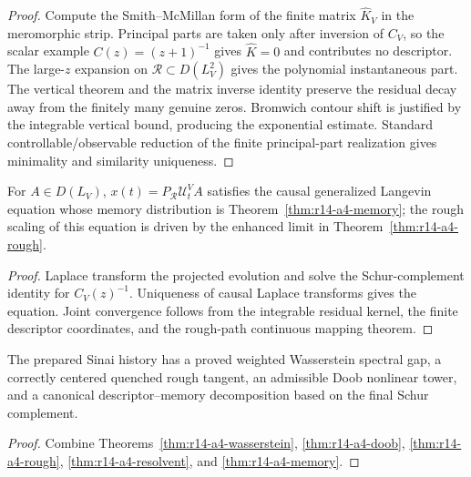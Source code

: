 \begin{proof}
Compute the Smith--McMillan form of the finite matrix
\(\widehat K_V\) in the meromorphic strip.  Principal parts are taken only
after inversion of \(C_V\), so the scalar example
\(C(z)=(z+1)^{-1}\) gives \(\widehat K=0\) and contributes no descriptor.
The large-\(z\) expansion on \(\mathcal R\subset D(L_V^2)\) gives the
polynomial instantaneous part.  The vertical theorem and the matrix inverse
identity preserve the residual decay away from the finitely many genuine
zeros.  Bromwich contour shift is justified by the integrable vertical
bound, producing the exponential estimate.  Standard controllable/observable
reduction of the finite principal-part realization gives minimality and
similarity uniqueness.
\end{proof}

\begin{corollary}
\label{cor:r14-a4-volterra}
For \(A\in D(L_V)\), \(x(t)=P_{\mathcal R}\mathcal U_t^VA\) satisfies the
causal generalized Langevin equation whose memory distribution is
Theorem~\ref{thm:r14-a4-memory}; the rough scaling of this equation is driven
by the enhanced limit in Theorem~\ref{thm:r14-a4-rough}.
\end{corollary}

\begin{proof}
Laplace transform the projected evolution and solve the Schur-complement
identity for \(C_V(z)^{-1}\).  Uniqueness of causal Laplace transforms gives
the equation.  Joint convergence follows from the integrable residual kernel,
the finite descriptor coordinates, and the rough-path continuous mapping
theorem.
\end{proof}

\begin{theorem}
\label{thm:r14-a4-main}
The prepared Sinai history has a proved weighted Wasserstein spectral gap, a
correctly centered quenched rough tangent, an admissible Doob nonlinear tower,
and a canonical descriptor--memory decomposition based on the final
Schur complement.
\end{theorem}

\begin{proof}
Combine Theorems~\ref{thm:r14-a4-wasserstein},
\ref{thm:r14-a4-doob}, \ref{thm:r14-a4-rough},
\ref{thm:r14-a4-resolvent}, and \ref{thm:r14-a4-memory}.
\end{proof}
